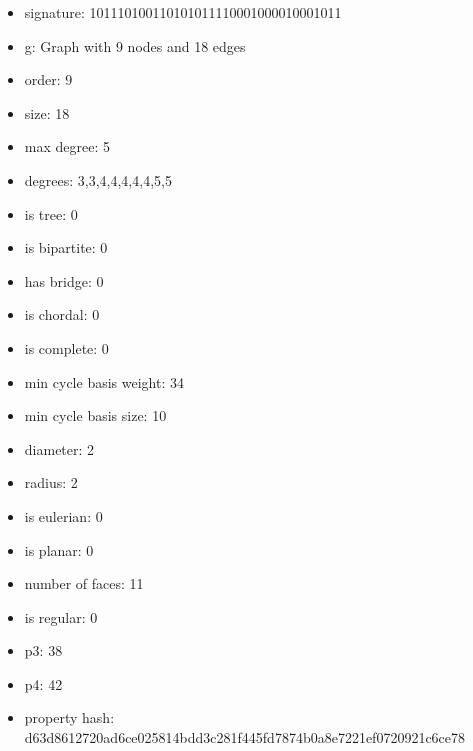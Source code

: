 \newpage
\begin{figure}
\end{figure}
\begin{itemize}
\item signature: 101110100110101011110001000010001011
\item g: Graph with 9 nodes and 18 edges
\item order: 9
\item size: 18
\item max degree: 5
\item degrees: 3,3,4,4,4,4,4,5,5
\item is tree: 0
\item is bipartite: 0
\item has bridge: 0
\item is chordal: 0
\item is complete: 0
\item min cycle basis weight: 34
\item min cycle basis size: 10
\item diameter: 2
\item radius: 2
\item is eulerian: 0
\item is planar: 0
\item number of faces: 11
\item is regular: 0
\item p3: 38
\item p4: 42
\item property hash: d63d8612720ad6ce025814bdd3c281f445fd7874b0a8e7221ef0720921c6ce78
\end{itemize}
